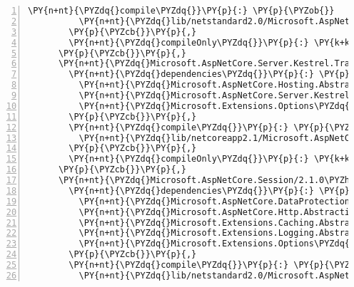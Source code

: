 \begin{Verbatim}[commandchars=\\\{\},numbers=left,firstnumber=1,stepnumber=1,numberblanklines=0]
        \PY{n+nt}{\PYZdq{}compile\PYZdq{}}\PY{p}{:} \PY{p}{\PYZob{}}
          \PY{n+nt}{\PYZdq{}lib/netstandard2.0/Microsoft.AspNetCore.Server.Kestrel.Transport.Abstractions.dll\PYZdq{}}\PY{p}{:} \PY{p}{\PYZob{}}\PY{p}{\PYZcb{}}
        \PY{p}{\PYZcb{}}\PY{p}{,}
        \PY{n+nt}{\PYZdq{}compileOnly\PYZdq{}}\PY{p}{:} \PY{k+kc}{true}
      \PY{p}{\PYZcb{}}\PY{p}{,}
      \PY{n+nt}{\PYZdq{}Microsoft.AspNetCore.Server.Kestrel.Transport.Sockets/2.1.0\PYZhy{}rc1\PYZhy{}final\PYZdq{}}\PY{p}{:} \PY{p}{\PYZob{}}
        \PY{n+nt}{\PYZdq{}dependencies\PYZdq{}}\PY{p}{:} \PY{p}{\PYZob{}}
          \PY{n+nt}{\PYZdq{}Microsoft.AspNetCore.Hosting.Abstractions\PYZdq{}}\PY{p}{:} \PY{l+s+s2}{\PYZdq{}2.1.0\PYZhy{}rc1\PYZhy{}final\PYZdq{}}\PY{p}{,}
          \PY{n+nt}{\PYZdq{}Microsoft.AspNetCore.Server.Kestrel.Transport.Abstractions\PYZdq{}}\PY{p}{:} \PY{l+s+s2}{\PYZdq{}2.1.0\PYZhy{}rc1\PYZhy{}final\PYZdq{}}\PY{p}{,}
          \PY{n+nt}{\PYZdq{}Microsoft.Extensions.Options\PYZdq{}}\PY{p}{:} \PY{l+s+s2}{\PYZdq{}2.1.0\PYZhy{}rc1\PYZhy{}final\PYZdq{}}
        \PY{p}{\PYZcb{}}\PY{p}{,}
        \PY{n+nt}{\PYZdq{}compile\PYZdq{}}\PY{p}{:} \PY{p}{\PYZob{}}
          \PY{n+nt}{\PYZdq{}lib/netcoreapp2.1/Microsoft.AspNetCore.Server.Kestrel.Transport.Sockets.dll\PYZdq{}}\PY{p}{:} \PY{p}{\PYZob{}}\PY{p}{\PYZcb{}}
        \PY{p}{\PYZcb{}}\PY{p}{,}
        \PY{n+nt}{\PYZdq{}compileOnly\PYZdq{}}\PY{p}{:} \PY{k+kc}{true}
      \PY{p}{\PYZcb{}}\PY{p}{,}
      \PY{n+nt}{\PYZdq{}Microsoft.AspNetCore.Session/2.1.0\PYZhy{}rc1\PYZhy{}final\PYZdq{}}\PY{p}{:} \PY{p}{\PYZob{}}
        \PY{n+nt}{\PYZdq{}dependencies\PYZdq{}}\PY{p}{:} \PY{p}{\PYZob{}}
          \PY{n+nt}{\PYZdq{}Microsoft.AspNetCore.DataProtection\PYZdq{}}\PY{p}{:} \PY{l+s+s2}{\PYZdq{}2.1.0\PYZhy{}rc1\PYZhy{}final\PYZdq{}}\PY{p}{,}
          \PY{n+nt}{\PYZdq{}Microsoft.AspNetCore.Http.Abstractions\PYZdq{}}\PY{p}{:} \PY{l+s+s2}{\PYZdq{}2.1.0\PYZhy{}rc1\PYZhy{}final\PYZdq{}}\PY{p}{,}
          \PY{n+nt}{\PYZdq{}Microsoft.Extensions.Caching.Abstractions\PYZdq{}}\PY{p}{:} \PY{l+s+s2}{\PYZdq{}2.1.0\PYZhy{}rc1\PYZhy{}final\PYZdq{}}\PY{p}{,}
          \PY{n+nt}{\PYZdq{}Microsoft.Extensions.Logging.Abstractions\PYZdq{}}\PY{p}{:} \PY{l+s+s2}{\PYZdq{}2.1.0\PYZhy{}rc1\PYZhy{}final\PYZdq{}}\PY{p}{,}
          \PY{n+nt}{\PYZdq{}Microsoft.Extensions.Options\PYZdq{}}\PY{p}{:} \PY{l+s+s2}{\PYZdq{}2.1.0\PYZhy{}rc1\PYZhy{}final\PYZdq{}}
        \PY{p}{\PYZcb{}}\PY{p}{,}
        \PY{n+nt}{\PYZdq{}compile\PYZdq{}}\PY{p}{:} \PY{p}{\PYZob{}}
          \PY{n+nt}{\PYZdq{}lib/netstandard2.0/Microsoft.AspNetCore.Session.dll\PYZdq{}}\PY{p}{:} \PY{p}{\PYZob{}}\PY{p}{\PYZcb{}}

\end{Verbatim}
